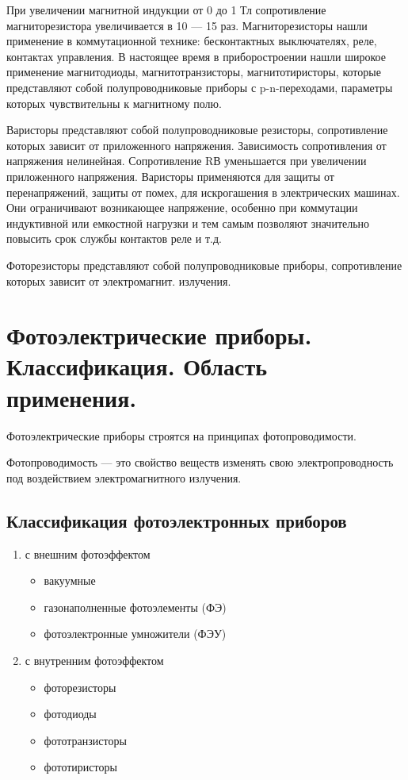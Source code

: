 При увеличении магнитной индукции от 0 до 1 Тл сопротивление магниторезистора увеличивается в 10 --- 15 раз. Магниторезисторы нашли применение в коммутационной технике: бесконтактных выключателях, реле, контактах управления. В настоящее время в приборостроении нашли широкое применение магнитодиоды, магнитотранзисторы, магнитотиристоры, которые представляют собой полупроводниковые приборы с p-n-переходами, параметры которых чувствительны к магнитному полю.

Варисторы представляют собой полупроводниковые резисторы, сопротивление которых зависит от приложенного напряжения. Зависимость сопротивления от напряжения нелинейная. Сопротивление RВ уменьшается при увеличении приложенного напряжения. Варисторы применяются для защиты от перенапряжений, защиты от помех, для искрогашения в электрических машинах. Они ограничивают возникающее напряжение, особенно при коммутации индуктивной или емкостной нагрузки и тем самым позволяют значительно повысить срок службы контактов реле и т.д.

Фоторезисторы представляют собой полупроводниковые приборы, сопротивление которых зависит от электромагнит. излучения.


\section{Фотоэлектрические приборы. Классификация. Область применения.}

Фотоэлектрические приборы строятся на принципах фотопроводимости.

Фотопроводимость --- это свойство веществ изменять свою электропроводность под воздействием электромагнитного излучения.

\subsection*{Классификация фотоэлектронных приборов}

\begin{enumerate}
\item с внешним фотоэффектом
	\begin{itemize}
	\item вакуумные
	\item газонаполненные фотоэлементы (ФЭ)
	\item фотоэлектронные умножители (ФЭУ)
	\end{itemize}
\item с внутренним фотоэффектом
	\begin{itemize}
	\item фоторезисторы
	\item фотодиоды
	\item фототранзисторы
	\item фототиристоры
	\end{itemize}
\end{enumerate}


